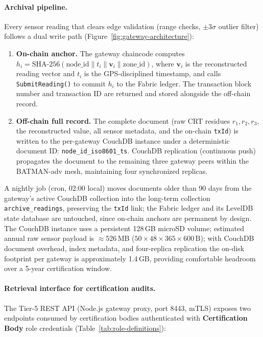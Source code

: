 \documentclass[pdflatex,sn-mathphys-num]{sn-jnl}
\theoremstyle{thmstyleone}
\theoremstyle{thmstyletwo}
\theoremstyle{thmstylethree}
\begin{document}
\paragraph{Archival pipeline.}
Every sensor reading that clears edge validation (range checks, $\pm3\sigma$ outlier filter) follows a dual write path (Figure~\ref{fig:gateway-architecture}):
\begin{enumerate}
  \item \textbf{On-chain anchor.} The gateway chaincode computes $h_i = \text{SHA-256}(\text{node\_id} \| t_i \| \mathbf{v}_i \| \text{zone\_id})$, where $\mathbf{v}_i$ is the reconstructed reading vector and $t_i$ is the GPS-disciplined timestamp, and calls \texttt{SubmitReading()} to commit $h_i$ to the Fabric ledger. The transaction block number and transaction ID are returned and stored alongside the off-chain record.
  \item \textbf{Off-chain full record.} The complete document (raw CRT residues $r_1, r_2, r_3$, the reconstructed value, all sensor metadata, and the on-chain \texttt{txId}) is written to the per-gateway CouchDB instance under a deterministic document ID: \texttt{node\_id\_iso8601\_ts}. CouchDB replication (continuous push) propagates the document to the remaining three gateway peers within the BATMAN-adv mesh, maintaining four synchronized replicas.
\end{enumerate}
A nightly job (cron, 02:00 local) moves documents older than 90 days from the gateway's active CouchDB collection into the long-term collection \texttt{archive\_readings}, preserving the \texttt{txId} link; the Fabric ledger and its LevelDB state database are untouched, since on-chain anchors are permanent by design. The CouchDB instance uses a persistent 128\,GB microSD volume; estimated annual raw sensor payload is $\approx$526\,MB ($50 \times 48 \times 365 \times 600\,\text{B}$); with CouchDB document overhead, index metadata, and four-replica replication the on-disk footprint per gateway is approximately 1.4\,GB, providing comfortable headroom over a 5-year certification window.

\paragraph{Retrieval interface for certification audits.}
The Tier-5 REST API (Node.js gateway proxy, port 8443, mTLS) exposes two endpoints consumed by certification bodies authenticated with \textbf{Certification Body} role credentials (Table~\ref{tab:role-definitions}):
\end{document}
